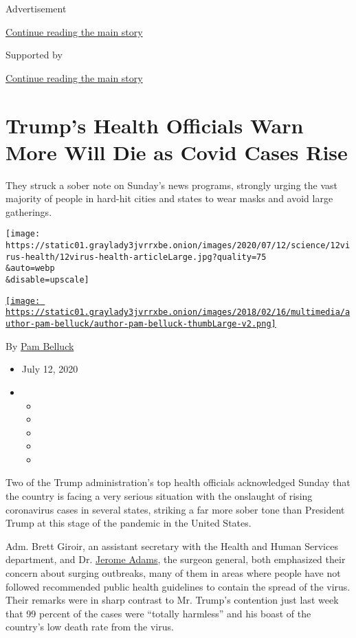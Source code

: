 Advertisement

\protect\hyperlink{after-top}{Continue reading the main story}

Supported by

\protect\hyperlink{after-sponsor}{Continue reading the main story}

\hypertarget{trumps-health-officials-warn-more-will-die-as-covid-cases-rise}{%
\section{Trump's Health Officials Warn More Will Die as Covid Cases
Rise}\label{trumps-health-officials-warn-more-will-die-as-covid-cases-rise}}

They struck a sober note on Sunday's news programs, strongly urging the
vast majority of people in hard-hit cities and states to wear masks and
avoid large gatherings.

\texttt{[image: https://static01.graylady3jvrrxbe.onion/images/2020/07/12/science/12virus-health/12virus-health-articleLarge.jpg?quality=75\\\&auto=webp\\\&disable=upscale]}

\href{https://www.nytimes3xbfgragh.onion/by/pam-belluck}{\texttt{[image: https://static01.graylady3jvrrxbe.onion/images/2018/02/16/multimedia/author-pam-belluck/author-pam-belluck-thumbLarge-v2.png]}}

By \href{https://www.nytimes3xbfgragh.onion/by/pam-belluck}{Pam Belluck}

\begin{itemize}
\item
  July 12, 2020
\item
  \begin{itemize}
  \item
  \item
  \item
  \item
  \item
  \end{itemize}
\end{itemize}

Two of the Trump administration's top health officials acknowledged
Sunday that the country is facing a very serious situation with the
onslaught of rising coronavirus cases in several states, striking a far
more sober tone than President Trump at this stage of the pandemic in
the United States.

Adm. Brett Giroir, an assistant secretary with the Health and Human
Services department, and Dr.
\href{https://www.nytimes3xbfgragh.onion/2020/07/21/us/politics/jerome-adams-surgeon-general-trump-coronavirus.html}{Jerome
Adams}, the surgeon general, both emphasized their concern about surging
outbreaks, many of them in areas where people have not followed
recommended public health guidelines to contain the spread of the virus.
Their remarks were in sharp contrast to Mr. Trump's contention just last
week that 99 percent of the cases were ``totally harmless'' and his
boast of the country's low death rate from the virus.

